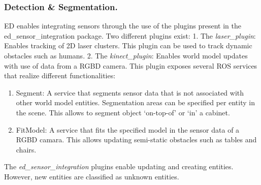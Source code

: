 \subsubsection{Detection \& Segmentation.}
ED enables integrating sensors through the use of the plugins present in the ed\_sensor\_integration package. Two different plugins exist:
1. The \emph{laser\_plugin}: Enables tracking of 2D laser clusters. This plugin can be used to track dynamic obstacles such as humans.
2. The \emph{kinect\_plugin}: Enables world model updates with use of data from a RGBD camera. This plugin exposes several ROS services that realize different functionalities:
\begin{enumerate}[label=(\alph*)]
\item Segment: A service that segments sensor data that is not associated with other world model entities. Segmentation areas can be specified per entity in the scene. This allows to segment object ‘on-top-of’ or ‘in’ a cabinet.
\item FitModel: A service that fits the specified model in the sensor data of a RGBD camara. This allows updating semi-static obstacles such as tables and chairs.
\end{enumerate}


The \emph{ed\_sensor\_integration} plugins enable updating and creating entities. However, new entities are classified as unknown entities.
